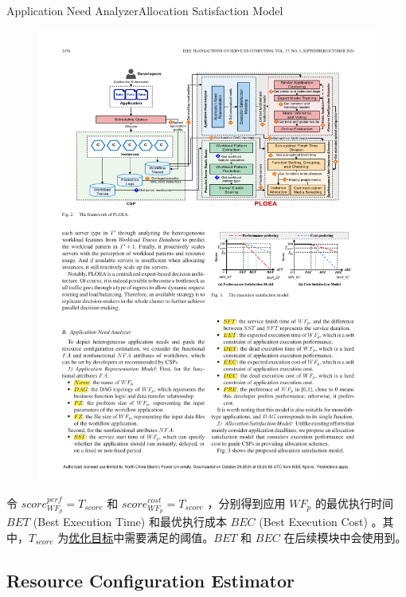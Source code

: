 \documentclass[aspectratio=169]{beamer}
\begin{document}
\begin{frame}{Application Need Analyzer}{Allocation Satisfaction Model}\label{label:bet-and-bec}
  \begin{figure}
    \centering
    \includegraphics[height=0.5\textheight]{img/method/satisfaction-model.pdf}
  \end{figure}
  令 $score_{WF_p}^{perf} = T_{score}$ 和 $score_{WF_p}^{cost} = T_{score}$ ，分别得到应用 $WF_p$ 的最优执行时间 $BET$ (Best Execution Time) 和最优执行成本 $BEC$ (Best Execution Cost) 。其中，$T_{score}$ 为\hyperlink{label:objective}{\underline{优化目标}}中需要满足的阈值。$BET$ 和 $BEC$ 在后续模块中会使用到。

  \hfill\hyperlink{label:sample-representation}{}
\end{frame}

\subsection{Resource Configuration Estimator}
\end{document}
